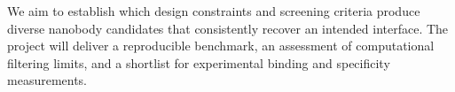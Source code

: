 We aim to establish which design constraints and screening criteria produce diverse nanobody candidates that consistently recover an intended interface. The project will deliver a reproducible benchmark, an assessment of computational filtering limits, and a shortlist for experimental binding and specificity measurements.
